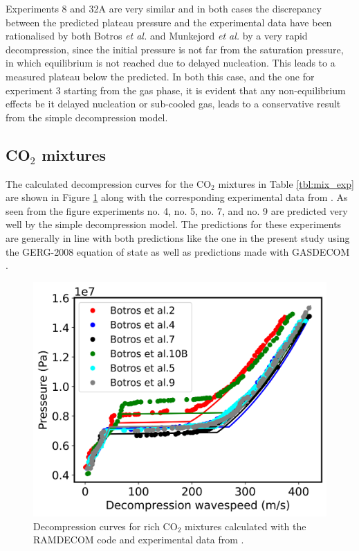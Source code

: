 \documentclass[a4paper, 10pt, twocolumn, twoside]{scrartcl}
\begin{document}
Experiments 8 and 32A are very similar and in both cases the discrepancy between the predicted plateau pressure and the experimental data have been rationalised by both Botros \emph{et al.} \cite{Botros_pure} and Munkejord \emph{et al.} \cite{MUNKEJORD2020118560} by a very rapid decompression, since the initial pressure is not far from the saturation pressure, in which equilibrium is not reached due to delayed nucleation. This leads to a measured plateau below the predicted. In both this case, and the one for experiment 3 starting from the gas phase, it is evident that any non-equilibrium effects be it delayed nucleation or sub-cooled gas, leads to a conservative result from the simple decompression model. 



\subsection{CO$_2$ mixtures}


The calculated decompression curves for the CO$_2$ mixtures in Table \ref{tbl:mix_exp} are shown in Figure \ref{fig:mix_combined} along with the corresponding experimental data from \cite{Botros_mixture}. As seen from the figure experiments no. 4, no. 5, no. 7, and no. 9 are predicted very well by the simple decompression model. The predictions for these experiments are generally in line with both predictions like the one in the present study using the GERG-2008 \cite{Botros_mixture} equation of state as well as predictions made with GASDECOM \cite{Cosham_GASDECOM}.

\begin{figure}[!ht]
	\centering
	\includegraphics[width=\columnwidth]{./Bilder/mix_combined.png}
	\caption{Decompression curves for rich CO$_2$ mixtures calculated with the RAMDECOM code and experimental data from \cite{Botros_mixture}.}
	\label{fig:mix_combined}
\end{figure}
\end{document}
